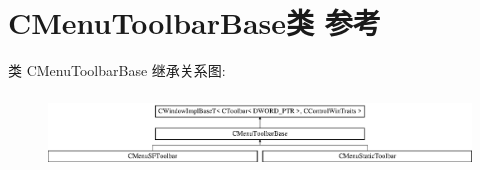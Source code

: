 \hypertarget{class_c_menu_toolbar_base}{}\section{C\+Menu\+Toolbar\+Base类 参考}
\label{class_c_menu_toolbar_base}
类 C\+Menu\+Toolbar\+Base 继承关系图\+:\begin{figure}[H]
\begin{center}
\leavevmode
\includegraphics[height=2.009569cm]{class_c_menu_toolbar_base}
\end{center}
\end{figure}
